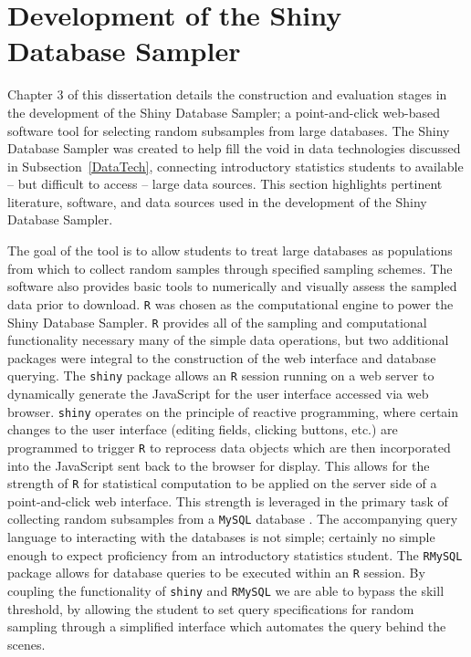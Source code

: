 \documentclass[11pt]{isuthesis}
\begin{document}
\section{Development of the Shiny Database Sampler}
\label{ShinyDBSamplerLit}

Chapter 3 of this dissertation details the construction and evaluation stages in the development of the Shiny Database Sampler; a point-and-click web-based software tool for selecting random subsamples from large databases. The Shiny Database Sampler was created to help fill the void in data technologies discussed in Subsection~\ref{DataTech}, connecting introductory statistics students to available -- but difficult to access -- large data sources. This section highlights pertinent literature, software, and data sources used in the development of the Shiny Database Sampler.

The goal of the tool is to allow students to treat large databases as populations from which to collect random samples through specified sampling schemes. The software also provides basic tools to numerically and visually assess the sampled data prior to download. \texttt{R} \citep{R} was chosen as the computational engine to power the Shiny Database Sampler. \texttt{R} provides all of the sampling and computational functionality necessary many of the simple data operations, but two additional packages were integral to the construction of the web interface and database querying. The \texttt{shiny} package \citep{shiny} allows an \texttt{R} session running on a web server to dynamically generate the JavaScript for the user interface accessed via web browser. \texttt{shiny} operates on the principle of reactive programming, where certain changes to the user interface (editing fields, clicking buttons, etc.) are programmed to trigger \texttt{R} to reprocess data objects which are then incorporated into the JavaScript sent back to the browser for display. This allows for the strength of \texttt{R} for statistical computation to be applied on the server side of a point-and-click web interface. This strength is leveraged in the primary task of collecting random subsamples from a \texttt{MySQL} database \citep{MySQL}. The accompanying query language to interacting with the databases is not simple; certainly no simple enough to expect proficiency from an introductory statistics student. The \texttt{RMySQL} package \citep{RMySQL} allows for database queries to be executed within an \texttt{R} session. By coupling the functionality of \texttt{shiny} and \texttt{RMySQL} we are able to bypass the skill threshold, by allowing the student to set query specifications for random sampling through a simplified interface which automates the query behind the scenes. 
\end{document}

